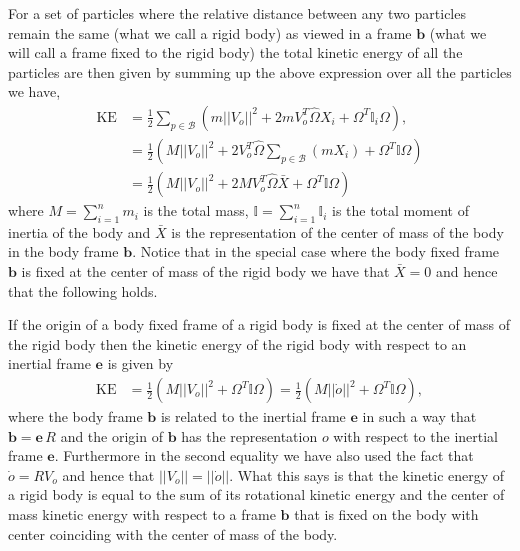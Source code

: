 \documentclass[graybox,envcountchap,sectrefs]{svmonoMuga}
\begin{document}
For a set of particles where the relative distance between any two particles remain the same (what we call a rigid body) as viewed in a frame $\mathbf{b}$ (what we will call a frame fixed to the rigid body) the total kinetic energy of all the particles are then given by
summing up the above expression over all the particles we have,
\begin{align}
\mathrm{KE}&=\frac{1}{2} \sum_{p\in \mathcal{B}}\left( m||V_o||^2+2mV_o^T\widehat{\Omega} X_i+\Omega^T\mathbb{I}_i\Omega\right),\nonumber\\
&= \frac{1}{2}\left(M||V_o||^2+2V_o^T\widehat{\Omega} \sum_{p\in \mathcal{B}}\left(mX_i\right)+\Omega^T\mathbb{I}\Omega \right)\nonumber\\
&= \frac{1}{2}\left(M||V_o||^2 +2MV_o^T\widehat{\Omega} \bar{X}+\Omega^T\mathbb{I}\Omega\right)\label{eq:KineticEnergyOfaParticleFixedInRotFrame222}
\end{align}
where $M=\sum_{i=1}^nm_i$ is the total mass, $\mathbb{I}=\sum_{i=1}^n\mathbb{I}_i$ is the total moment of inertia of the body and $\bar{X}$ is the representation of the center of mass of the body in the body frame $\mathbf{b}$.
Notice that in the special case where the body fixed frame $\mathbf{b}$ is fixed at the center of mass of the rigid body we have that $\bar{X}=0$ and hence that the following holds. 
\begin{svgraybox}
If the origin of a body fixed frame of a rigid body is fixed at the center of mass of the rigid body then the kinetic energy of the rigid body with respect to an inertial frame $\mathbf{e}$ is given by
\begin{align}
\mathrm{KE}
&= \frac{1}{2}\left(M||V_o||^2 +\Omega^T\mathbb{I}\Omega\right)= \frac{1}{2}\left(M||\dot{o}||^2 +\Omega^T\mathbb{I}\Omega\right),\label{eq:KineticEnergyOfaParticleFixedInRotFrame333}
\end{align}
where the body frame $\mathbf{b}$ is related to the inertial frame $\mathbf{e}$ in such a way that $\mathbf{b}=\mathbf{e}\,R$ and the origin of $\mathbf{b}$ has the representation $o$ with respect to the inertial frame $\mathbf{e}$. Furthermore in the second equality we have also used the fact that $\dot{o}=RV_o$ and hence that $||V_o||=||\dot{o}||$. What this says is that the kinetic energy of a rigid body is equal to the sum of its rotational kinetic energy and the center of mass kinetic energy with respect to a frame $\mathbf{b}$ that is fixed on the body with center coinciding with the center of mass of the body.
\end{svgraybox}
\end{document}
